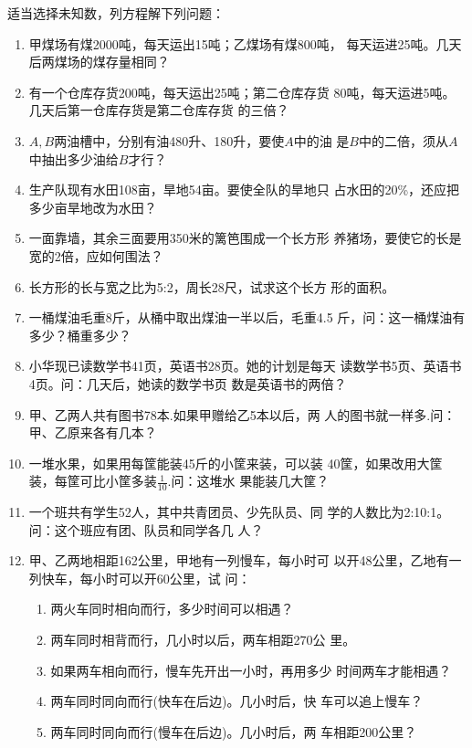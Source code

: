 适当选择未知数，列方程解下列问题：
\begin{enumerate}
    \item 甲煤场有煤2000吨，每天运出15吨；乙煤场有煤800吨，
每天运进25吨。几天后两煤场的煤存量相同？
\item 有一个仓库存货200吨，每天运出25吨；第二仓库存货
80吨，每天运进5吨。几天后第一仓库存货是第二仓库存货
的三倍？
\item  $A, B$两油槽中，分别有油480升、180升，要使$A$中的油
是$B$中的二倍，须从$A$中抽出多少油给$B$才行？
\item 生产队现有水田108亩，旱地54亩。要使全队的旱地只
占水田的20\%，还应把多少亩旱地改为水田？
\item 一面靠墙，其余三面要用350米的篱笆围成一个长方形
养猪场，要使它的长是宽的2倍，应如何围法？
\item 长方形的长与宽之比为5:2，周长28尺，试求这个长方
形的面积。
\item 一桶煤油毛重8斤，从桶中取出煤油一半以后，毛重4.5
斤，问：这一桶煤油有多少？桶重多少？
\item 小华现已读数学书41页，英语书28页。她的计划是每天
读数学书5页、英语书4页。问：几天后，她读的数学书页
数是英语书的两倍？
\item 甲、乙两人共有图书78本.如果甲赠给乙5本以后，两
人的图书就一样多.问：甲、乙原来各有几本？
\item 一堆水果，如果用每筐能装45斤的小筐来装，可以装
40筐，如果改用大筐装，每筐可比小筐多装$\frac{1}{10}$.问：这堆水
果能装几大筐？
\item 一个班共有学生52人，其中共青团员、少先队员、同
学的人数比为2:10:1。问：这个班应有团、队员和同学各几
人？
\item 甲、乙两地相距162公里，甲地有一列慢车，每小时可
以开48公里，乙地有一列快车，每小时可以开60公里，试
问：
\begin{enumerate}
    \item  两火车同时相向而行，多少时间可以相遇？
    \item  两车同时相背而行，几小时以后，两车相距270公
里。
\item  如果两车相向而行，慢车先开出一小时，再用多少
时间两车才能相遇？
\item  两车同时同向而行(快车在后边)。几小时后，快
车可以追上慢车？
\item  两车同时同向而行(慢车在后边)。几小时后，两
车相距200公里？
\end{enumerate}
 

\end{enumerate}

